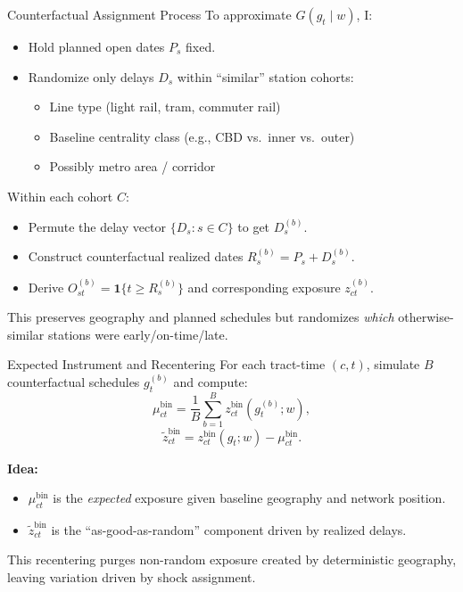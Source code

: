 \documentclass{beamer}
\begin{document}
\begin{frame}{Counterfactual Assignment Process}
\small
To approximate $G(g_t \mid w)$, I:
\begin{itemize}
    \item Hold planned open dates $P_s$ fixed.
    \item Randomize only delays $D_s$ within “similar” station cohorts:
    \begin{itemize}
        \item Line type (light rail, tram, commuter rail)
        \item Baseline centrality class (e.g., CBD vs.\ inner vs.\ outer)
        \item Possibly metro area / corridor
    \end{itemize}
\end{itemize}

\medskip
Within each cohort $C$:
\begin{itemize}
    \item Permute the delay vector $\{D_s : s \in C\}$ to get $D_s^{(b)}$.
    \item Construct counterfactual realized dates $R_s^{(b)} = P_s + D_s^{(b)}$.
    \item Derive $O^{(b)}_{st} = \mathbf{1}\{t \ge R_s^{(b)}\}$ and corresponding exposure $z^{(b)}_{ct}$.
\end{itemize}

\medskip
This preserves geography and planned schedules but randomizes \emph{which} otherwise-similar stations were early/on-time/late.
\end{frame}

\begin{frame}{Expected Instrument and Recentering}
\small
For each tract-time $(c,t)$, simulate $B$ counterfactual schedules $g_t^{(b)}$ and compute:
\[
\mu^{\text{bin}}_{ct} = \frac{1}{B} \sum_{b=1}^B z^{\text{bin}}_{ct}(g_t^{(b)}; w),
\]
\[
\tilde{z}^{\text{bin}}_{ct} = z^{\text{bin}}_{ct}(g_t; w) - \mu^{\text{bin}}_{ct}.
\]

\medskip
\textbf{Idea:}
\begin{itemize}
    \item $\mu^{\text{bin}}_{ct}$ is the \emph{expected} exposure given baseline geography and network position.
    \item $\tilde{z}^{\text{bin}}_{ct}$ is the “as-good-as-random” component driven by realized delays.
\end{itemize}

\medskip
This recentering purges non-random exposure created by deterministic geography, leaving variation driven by shock assignment.
\end{frame}
\end{document}
